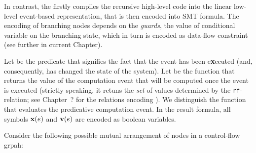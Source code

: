 In contrast, the  firstly compiles the recursive high-level code into the linear low-level event-based representation,
that is then encoded into SMT formula. The encoding of branching nodes depends on the \textit{guards}, the value of conditional variable on the branching state, which in turn is encoded as data-flow constraint (see further in current Chapter).

Let  be the predicate that signifies the fact that the event has been e\textbf{x}ecuted (and, consequently, has changed the state of the system). 
Let  be the function that returns the value of the computation event that will be computed once the event is executed (strictly speaking, it retuns the \textit{set} of values determined by the \texttt{rf}-relation; see Chapter~? for the relations encoding%
). We distinguish the function  that evaluates the predicative computation event. In the result formula, all symbols $\mathbf{x}(e)$ and $\mathbf{v}(e)$ are encoded as boolean variables.

Consider the following possible mutual arrangement of nodes in a control-flow grpah:

